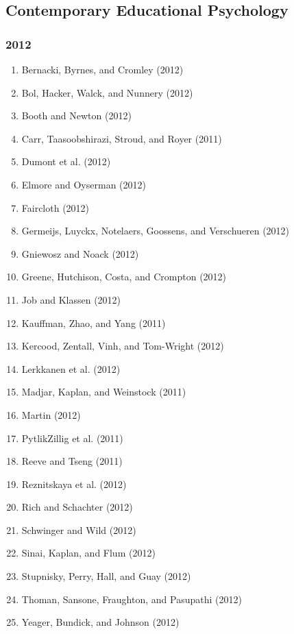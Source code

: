 \documentclass[english,man]{apa6}
\providecommand{\tightlist}{%
  \setlength{\itemsep}{0pt}\setlength{\parskip}{0pt}}
\theoremstyle{definition}
\theoremstyle{definition}
\theoremstyle{definition}
\theoremstyle{remark}
\begin{document}
\subsection{Contemporary Educational
Psychology}\label{contemporary-educational-psychology}

\subsubsection{2012}\label{section-16}

\begin{enumerate}
\def\labelenumi{\arabic{enumi})}
\tightlist
\item
  Bernacki, Byrnes, and Cromley (2012)
\item
  Bol, Hacker, Walck, and Nunnery (2012)
\item
  Booth and Newton (2012)
\item
  Carr, Taasoobshirazi, Stroud, and Royer (2011)
\item
  Dumont et al. (2012)
\item
  Elmore and Oyserman (2012)
\item
  Faircloth (2012)
\item
  Germeijs, Luyckx, Notelaers, Goossens, and Verschueren (2012)
\item
  Gniewosz and Noack (2012)
\item
  Greene, Hutchison, Costa, and Crompton (2012)
\item
  Job and Klassen (2012)
\item
  Kauffman, Zhao, and Yang (2011)
\item
  Kercood, Zentall, Vinh, and Tom-Wright (2012)
\item
  Lerkkanen et al. (2012)
\item
  Madjar, Kaplan, and Weinstock (2011)
\item
  Martin (2012)
\item
  PytlikZillig et al. (2011)
\item
  Reeve and Tseng (2011)
\item
  Reznitskaya et al. (2012)
\item
  Rich and Schachter (2012)
\item
  Schwinger and Wild (2012)
\item
  Sinai, Kaplan, and Flum (2012)
\item
  Stupnisky, Perry, Hall, and Guay (2012)
\item
  Thoman, Sansone, Fraughton, and Pasupathi (2012)
\item
  Yeager, Bundick, and Johnson (2012)
\end{enumerate}
\end{document}
